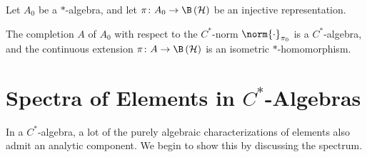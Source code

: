 \begin{corollary}
  Let $A_0$ be a $\ast$-algebra, and let $\pi\colon A_0\rightarrow \B\left( \mathcal{H} \right)$ be an injective representation.\newline

  The completion $A$ of $A_0$ with respect to the $C^{\ast}$-norm $\norm{\cdot}_{\pi_0}$ is a $C^{\ast}$-algebra, and the continuous extension $\pi\colon A\rightarrow \B\left( \mathcal{H} \right)$ is an isometric $\ast$-homomorphism.
\end{corollary}
\section{Spectra of Elements in \texorpdfstring{$C^{\ast}$-Algebras}{C*-Algebras}}%
In a $C^{\ast}$-algebra, a lot of the purely algebraic characterizations of elements also admit an analytic component. We begin to show this by discussing the spectrum.\newline

